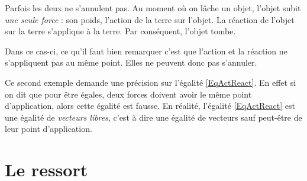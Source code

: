 \begin{exemple}
Parfois les deux ne s'annulent pas. Au moment où on lâche un objet, l'objet subit \emph{une seule force} : son poids, l'action de la terre sur l'objet. La réaction de l'objet sur la terre s'applique à la terre. Par conséquent, l'objet tombe.

Dans ce cas-ci, ce qu'il faut bien remarquer c'est que l'action et la réaction ne s'appliquent pas au même point. Elles ne peuvent donc pas s'annuler.
\end{exemple}

Ce second exemple demande une précision sur l'égalité \eqref{EqActReact}. En effet si on dit que pour être égales, deux forces doivent avoir le même point d'application, alors cette égalité est fausse. En réalité, l'égalité \eqref{EqActReact} est une égalité de \emph{vecteurs libres}, c'est à dire une égalité de vecteurs \og sauf peut-être de leur point d'application\fg.

\section{Le ressort}



